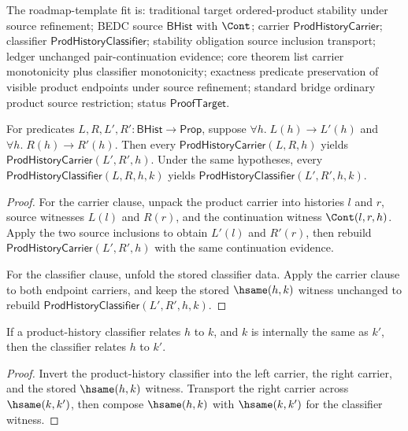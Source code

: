 \begin{theorem}
\label{thm:prod-history-source-monotonicity}
The roadmap-template fit is: traditional target ordered-product stability
under source refinement; BEDC source $\mathsf{BHist}$ with $\Cont$; carrier
$\mathsf{ProdHistoryCarrier}$; classifier $\mathsf{ProdHistoryClassifier}$;
stability obligation source inclusion transport; ledger unchanged
pair-continuation evidence; core theorem list carrier monotonicity plus
classifier monotonicity; exactness predicate preservation of visible product
endpoints under source refinement; standard bridge ordinary product source
restriction; status $\mathsf{ProofTarget}$.

For predicates $L,R,L',R':\mathsf{BHist}\to\mathsf{Prop}$, suppose
$\forall h.\; L(h)\to L'(h)$ and $\forall h.\; R(h)\to R'(h)$. Then every
$\mathsf{ProdHistoryCarrier}(L,R,h)$ yields
$\mathsf{ProdHistoryCarrier}(L',R',h)$. Under the same hypotheses, every
$\mathsf{ProdHistoryClassifier}(L,R,h,k)$ yields
$\mathsf{ProdHistoryClassifier}(L',R',h,k)$.
\end{theorem}
\begin{proof}
For the carrier clause, unpack the product carrier into histories $l$ and $r$,
source witnesses $L(l)$ and $R(r)$, and the continuation witness
$\Cont(l,r,h)$. Apply the two source inclusions to obtain $L'(l)$ and $R'(r)$,
then rebuild $\mathsf{ProdHistoryCarrier}(L',R',h)$ with the same continuation
evidence.

For the classifier clause, unfold the stored classifier data. Apply the carrier
clause to both endpoint carriers, and keep the stored $\hsame(h,k)$ witness
unchanged to rebuild $\mathsf{ProdHistoryClassifier}(L',R',h,k)$.
\end{proof}

\begin{theorem}
\label{thm:prod-history-classifier-right-hsame-transport}
If a product-history classifier relates $h$ to $k$, and $k$ is internally the same as $k'$, then the classifier relates $h$ to $k'$.
\end{theorem}
\begin{proof}
Invert the product-history classifier into the left carrier, the right carrier, and the stored $\hsame(h,k)$ witness. Transport the right carrier across $\hsame(k,k')$, then compose $\hsame(h,k)$ with $\hsame(k,k')$ for the classifier witness.
\end{proof}

